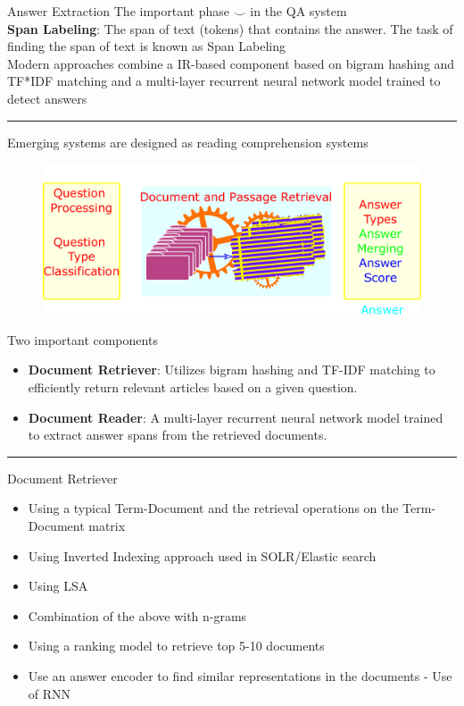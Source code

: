 \begin{frame}[shrink=15]{Answer Extraction}
The important phase $\smile$ in the QA system\\
\textbf{Span Labeling}: The span of text (tokens) that contains the answer. The task of finding the span of text is known as Span Labeling\\

Modern approaches combine a IR-based component   based   on   bigram   hashing and  TF*IDF  matching  and a  multi-layer recurrent neural network model trained to detect  answers \cite{NIPS2015_afdec700} \cite{chen2017reading}
\rule{\linewidth}{0.1mm}
\begin{minipage}{0.4\linewidth}
Emerging systems are designed as reading comprehension systems
\begin{figure}
	\centering
	\includegraphics[width=0.9\linewidth]{./Images/AnswerProcessing}
	\label{fig:answerprocessing}
\end{figure}
\end{minipage}
\begin{minipage}{0.59\linewidth}
    Two important components
\begin{itemize}
    \item \textbf{Document Retriever}: Utilizes bigram hashing and TF-IDF matching to efficiently return relevant articles based on a given question.
    \item \textbf{Document Reader}: A multi-layer recurrent neural network model trained to extract answer spans from the retrieved documents.
\end{itemize}
\end{minipage}
\rule{\linewidth}{0.1mm}

\end{frame}

\begin{frame}{Document Retriever}
\begin{itemize}
	\item Using a typical Term-Document and the retrieval operations on the Term-Document matrix
	\item Using Inverted Indexing approach used in SOLR/Elastic search
	\item Using LSA
	\item Combination of the above with n-grams
	\item Using a ranking model to retrieve top 5-10 documents
	\item Use an answer encoder to find similar representations in the documents - Use of RNN
\end{itemize}
\end{frame}


